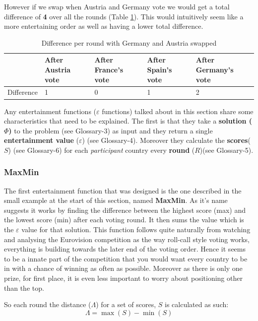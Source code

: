 \documentclass[12pt]{report}
\begin{document}
However if we swap when Austria and Germany vote we would get a total difference of \textbf{4} over all the rounds (Table \ref{t_simpleDifferences2}). This would intuitively seem like a more entertaining order as well as having a lower total difference.

\begin{table}[H]
\centering
\caption{Difference per round with Germany and Austria swapped}
\label{t_simpleDifferences2}
\begin{tabular}{|l|l|l|l|l|}
\hline
        & After Austria vote & After France's vote & After Spain's vote & After Germany's vote \\ \hline
Difference & 1                    & 0                  & 1                   & 2                    \\ \hline
\end{tabular}
\end{table}

Any entertainment functions ($\varepsilon$ functions) talked about in this section share some characteristics that need to be explained. The first is that they take a \textbf{solution ($\Phi$)} to the problem (see Glossary-3) as input and they return a single \textbf{entertainment value} ($\varepsilon$) (see Glossary-4). Moreover they calculate the \textbf{scores}($S$) (see Glossary-6) for each \textit{participant} country every \textbf{round} ($R$)(see Glossary-5).

\subsubsection{MaxMin}
The first entertainment function that was designed is the one described in the small example at the start of this section, named \textbf{MaxMin}. As it's name suggests it works by finding the difference between the highest score (max) and the lowest score (min) after each voting round. It then sums the value which is the $\varepsilon$ value for that solution. This function follows quite naturally from watching and analysing the Eurovision competition as the way roll-call style voting works, everything is building towards the later end of the voting order. Hence it seems to be a innate part of the competition that you would want every country to be in with a chance of winning as often as possible. Moreover as there is only one prize, for first place, it is even less important to worry about positioning other than the top.

So each round the distance ($\Lambda$) for a set of scores, $S$ is calculated as such:
\begin{equation}\label{lambda}
	\Lambda = \max(S) - \min(S)
\end{equation}
\end{document}
